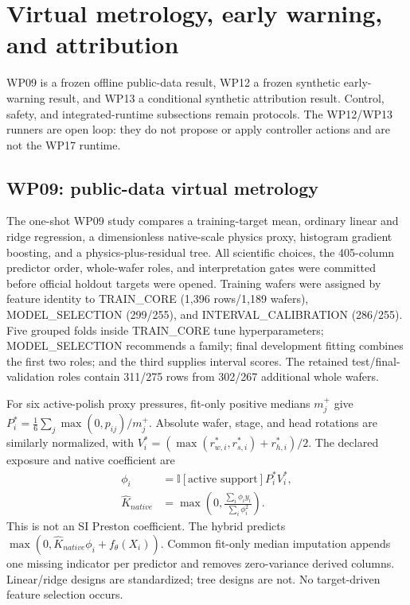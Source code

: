 \documentclass[10pt,twocolumn]{article}
\begin{document}
\section{Virtual metrology, early warning, and attribution}

WP09 is a frozen offline public-data result, WP12 a frozen synthetic
early-warning result, and WP13 a conditional synthetic attribution result.
Control, safety, and integrated-runtime subsections remain protocols. The
WP12/WP13 runners are open loop: they do not propose or apply controller
actions and are not the WP17 runtime.

\subsection{WP09: public-data virtual metrology}

The one-shot WP09 study compares a training-target mean, ordinary linear and
ridge regression, a dimensionless native-scale physics proxy, histogram
gradient boosting, and a physics-plus-residual tree. All scientific choices,
the 405-column predictor order, whole-wafer roles, and interpretation gates
were committed before official holdout targets were opened. Training wafers
were assigned by feature identity to TRAIN\_CORE (1,396 rows/1,189 wafers),
MODEL\_SELECTION (299/255), and INTERVAL\_CALIBRATION (286/255). Five grouped
folds inside TRAIN\_CORE tune hyperparameters; MODEL\_SELECTION recommends a
family; final development fitting combines the first two roles; and the third
supplies interval scores. The retained test/final-validation roles contain
311/275 rows from 302/267 additional whole wafers.

For six active-polish proxy pressures, fit-only positive medians $m_j^+$ give
$P_i^*=\frac{1}{6}\sum_j\max(0,p_{ij})/m_j^+$. Absolute wafer, stage, and
head rotations are similarly normalized, with
$V_i^*=(\max(r_{w,i}^*,r_{s,i}^*)+r_{h,i}^*)/2$. The declared exposure and
native coefficient are
\begin{equation}
 \begin{aligned}
 \phi_i &={} \mathbb I[\text{active support}]P_i^*V_i^*,\\
 \widehat K_{native} &={} \max\left(0,
 \frac{\sum_i\phi_i y_i}{\sum_i\phi_i^2}\right).
 \end{aligned}
 \label{eq:wp09-native-proxy}
\end{equation}
This is not an SI Preston coefficient. The hybrid predicts
$\max(0,\widehat K_{native}\phi_i+f_\theta(X_i))$. Common fit-only median
imputation appends one missing indicator per predictor and removes
zero-variance derived columns. Linear/ridge designs are standardized; tree
designs are not. No target-driven feature selection occurs.
\end{document}
